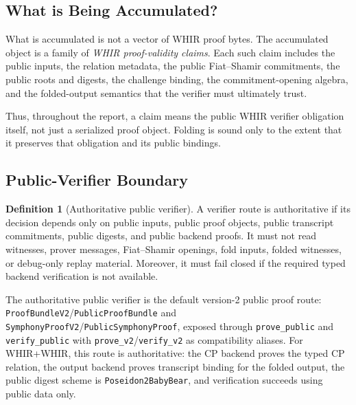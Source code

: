 \documentclass[11pt]{article}
\theoremstyle{definition}
\newtheorem{definition}[theorem]{Definition}
\begin{document}
\subsection{What is Being Accumulated?}
\label{sec:what-is-being-accumulated}
What is accumulated is not a vector of WHIR proof bytes. The accumulated object
is a family of \emph{WHIR proof-validity claims}. Each such claim includes the
public inputs, the relation metadata, the public Fiat--Shamir commitments, the
public roots and digests, the challenge binding, the commitment-opening algebra,
and the folded-output semantics that the verifier must ultimately trust.

Thus, throughout the report, a claim means the public WHIR verifier obligation
itself, not just a serialized proof object. Folding is sound only to the extent
that it preserves that obligation and its public bindings.

\subsection{Public-Verifier Boundary}
\label{sec:public-verifier-boundary}
\begin{definition}[Authoritative public verifier]
A verifier route is authoritative if its decision depends only on public inputs,
public proof objects, public transcript commitments, public digests, and public
backend proofs. It must not read witnesses, prover messages, Fiat--Shamir
openings, fold inputs, folded witnesses, or debug-only replay material.
Moreover, it must fail closed if the required typed backend verification is not
available.
\end{definition}

The authoritative public verifier is the default version-2 public proof route:
\texttt{ProofBundleV2}\slash\texttt{PublicProofBundle} and
\texttt{SymphonyProofV2}\slash\texttt{PublicSymphonyProof}, exposed through
\texttt{prove\_public} and \texttt{verify\_public} with
\texttt{prove\_v2}\slash\texttt{verify\_v2} as compatibility aliases. For WHIR+WHIR,
this route is authoritative: the CP backend proves the typed CP relation, the
output backend proves transcript binding for the folded output, the public digest
scheme is \texttt{Poseidon2BabyBear}, and verification succeeds using public data
only.
\end{document}
